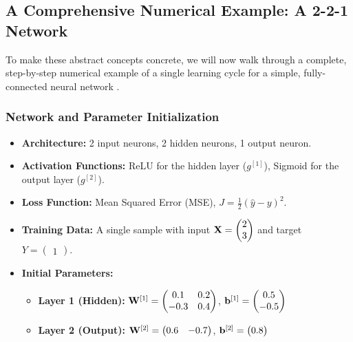 \subsection{A Comprehensive Numerical Example: A 2-2-1 Network}
To make these abstract concepts concrete, we will now walk through a complete, step-by-step numerical example of a single learning cycle for a simple, fully-connected neural network \cite{Mazur2015BackpropExample, Schiendorfer2020BackpropExample}.

\subsubsection{Network and Parameter Initialization}
\begin{itemize}
    \item \textbf{Architecture:} 2 input neurons, 2 hidden neurons, 1 output neuron.
    \item \textbf{Activation Functions:} ReLU for the hidden layer ($g^{[1]}$), Sigmoid for the output layer ($g^{[2]}$).
    \item \textbf{Loss Function:} Mean Squared Error (MSE), $J = \frac{1}{2}(\hat{y} - y)^2$.
    \item \textbf{Training Data:} A single sample with input $\mathbf{X} = \begin{pmatrix} 2 \\ 3 \end{pmatrix}$ and target $Y = \begin{pmatrix} 1 \end{pmatrix}$.
    \item \textbf{Initial Parameters:}
        \begin{itemize}
            \item \textbf{Layer 1 (Hidden):} $\mathbf{W}^{[1]} = \begin{pmatrix} 0.1 & 0.2 \\ -0.3 & 0.4 \end{pmatrix}$, $\mathbf{b}^{[1]} = \begin{pmatrix} 0.5 \\ -0.5 \end{pmatrix}$
            \item \textbf{Layer 2 (Output):} $\mathbf{W}^{[2]} = \begin{pmatrix} 0.6 & -0.7 \end{pmatrix}$, $\mathbf{b}^{[2]} = \begin{pmatrix} 0.8 \end{pmatrix}$
        \end{itemize}
\end{itemize}

